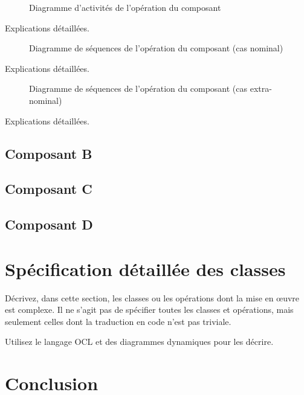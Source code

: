 \begin{figure}[!htbp]
\begin{center}
\caption{Diagramme d'activités de l'opération  du composant }
\end{center}
\end{figure}

Explications détaillées.

\begin{figure}[!htbp]
\begin{center}
\caption{Diagramme de séquences de l'opération  du composant  (cas nominal)}
\end{center}
\end{figure}
Explications détaillées.

\begin{figure}[!htbp]
\begin{center}
\caption{Diagramme de séquences de l'opération  du composant  (cas extra-nominal)}
\end{center}
\end{figure}

Explications détaillées.


\subsection{Composant B}
\subsection{Composant C}
\subsection{Composant D}


\section{Spécification détaillée des classes}
Décrivez, dans cette section, les classes ou les opérations dont la mise en œuvre est complexe.
Il ne s'agit pas de spécifier toutes les classes et opérations, mais seulement celles dont la traduction en code n'est pas triviale.

Utilisez le langage OCL et des diagrammes dynamiques pour les décrire.


\section{Conclusion}


